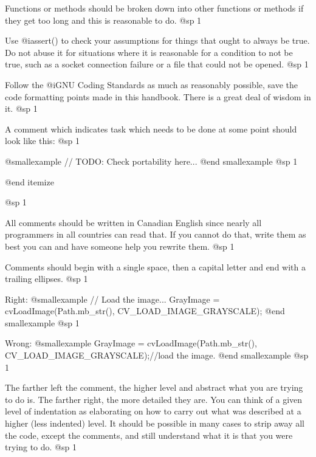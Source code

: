 \item
Functions or methods should be broken down into other functions or methods if they get too long and this is reasonable to do.
@sp 1

\item
Use @i{assert()} to check your assumptions for things that ought to always be true. Do not abuse it for situations where it is reasonable for a condition to not be true, such as a socket connection failure or a file that could not be opened.
@sp 1

\item
Follow the @i{GNU Coding Standards} as much as reasonably possible, save the code formatting points made in this handbook. There is a great deal of wisdom in it.
@sp 1

\item
A comment which indicates task which needs to be done at some point should look like this: 
@sp 1

@smallexample
// TODO: Check portability here...
@end smallexample
@sp 1

@end itemize

@sp 1

\itemize
\item
All comments should be written in Canadian English since nearly all programmers in all countries can read that. If you cannot do that, write them as best you can and have someone help you rewrite them.
@sp 1

\item
Comments should begin with a single space, then a capital letter and end with a trailing ellipses. 
@sp 1

Right:
@smallexample
// Load the image...
GrayImage = cvLoadImage(Path.mb_str(), CV_LOAD_IMAGE_GRAYSCALE);
@end smallexample
@sp 1

Wrong:
@smallexample
GrayImage = cvLoadImage(Path.mb_str(), CV_LOAD_IMAGE_GRAYSCALE);//load the image.
@end smallexample
@sp 1

\item
The farther left the comment, the higher level and abstract what you are trying to do is. The farther right, the more detailed they are. You can think of a given level of indentation as elaborating on how to carry out what was described at a higher (less indented) level. It should be possible in many cases to strip away all the code, except the comments, and still understand what it is that you were trying to do.
@sp 1


